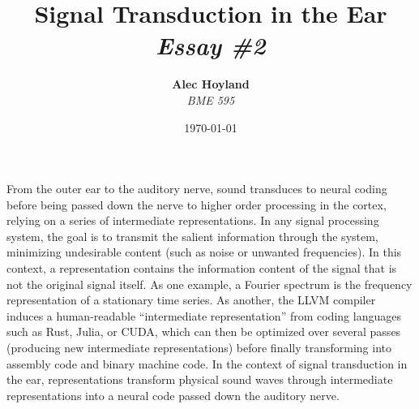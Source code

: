 \documentclass[11pt]{diazessay} %
\title{\textbf{Signal Transduction in the Ear} \\ {\Large\itshape Essay \#2}} %
\author{\textbf{Alec Hoyland} \\ \textit{BME 595}} %
\date{\today} %
\begin{document}
\maketitle %





\vspace{30pt} %


From the outer ear to the auditory nerve,
sound transduces to neural coding
before being passed down the nerve to higher
order processing in the cortex,
relying on a series of intermediate representations.
In any signal processing system,
the goal is to transmit the salient information through the system,
minimizing undesirable content
(such as noise or unwanted frequencies).
In this context, a representation contains the information content
of the signal that is not the original signal itself.
As one example, a Fourier spectrum is the frequency representation of a stationary time series.
As another, the LLVM compiler induces a human-readable ``intermediate representation''
from coding languages such as Rust, Julia, or CUDA,
which can then be optimized over several passes
(producing new intermediate representations)
before finally transforming into assembly code and binary machine code.
In the context of signal transduction in the ear,
representations transform physical sound waves
through intermediate representations
into a neural code passed down the auditory nerve.
\end{document}
